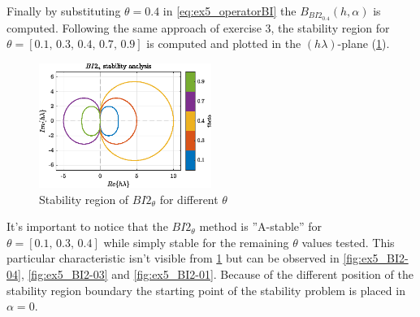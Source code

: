 \documentclass[11pt,a4paper,oneside]{article}
\begin{document}
Finally by substituting $\theta = 0.4$ in \cref{eq:ex5_operatorBI} the $B_{BI2_{0.4}}(h,\alpha)$ is computed.
Following the same approach of exercise 3, the stability region for $\theta = [0.1,\, 0.3,\, 0.4,\, 0.7,\, 0.9]$ is computed and plotted in the $(h\lambda)$-plane (\cref{fig:ex5_stabReg}).
\begin{figure}[htb]
    \centering
    \includegraphics*[width=0.5\textwidth, keepaspectratio]{ex5_stabReg.eps}
    \caption[]{\label{fig:ex5_stabReg} Stability region of $BI2_{\theta}$ for different $\theta$}
\end{figure}

It's important to notice that the $BI2_{\theta}$ method is ''A-stable'' for $\theta = [0.1,\, 0.3,\, 0.4]$ while simply stable for the remaining $\theta$ values tested.
This particular characteristic isn't visible from \cref{fig:ex5_stabReg} but can be observed in \cref{fig:ex5_BI2-04}, \cref{fig:ex5_BI2-03} and \cref{fig:ex5_BI2-01}.
Because of the different position of the stability region boundary the starting point of the stability problem is placed in $\alpha = 0$.
\end{document}
